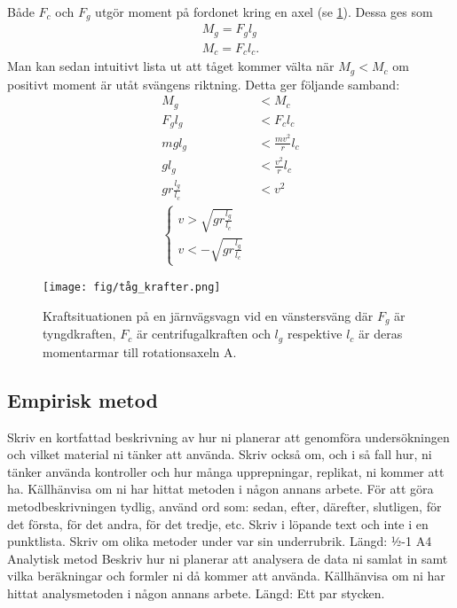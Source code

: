 Både $F_c$ och $F_g$ utgör moment på fordonet kring en axel (se \cref{fig:tåg_krafter_sväng}). Dessa ges som
\begin{gather}
    M_g = F_g l_g \\
    M_c = F_c l_c.
\end{gather}
Man kan sedan intuitivt lista ut att tåget kommer välta när $M_g < M_c$  om positivt moment är utåt svängens riktning. Detta ger följande samband:
\begin{align*}
    M_g &< M_c \\
    F_g l_g &< F_c l_c \\
    mg l_g &< \frac{mv^2}{r} l_c \\
    g l_g &< \frac{v^2}{r} l_c \\
    g r \frac{l_g}{l_c} &< v^2 \\
    \left\{
        \begin{array}{l}
            v > \sqrt{g r \frac{l_g}{l_c}} \\
            v < -\sqrt{g r \frac{l_g}{l_c}}
        \end{array}
    \right.
\end{align*}

\begin{figure}[h!]
    \centering
    \texttt{[image: fig/tåg\_krafter.png]}
    \caption{Kraftsituationen på en järnvägsvagn vid en vänstersväng där $F_g$ är tyngdkraften, $F_c$ är centrifugalkraften och $l_g$ respektive $l_c$ är deras momentarmar till rotationsaxeln A.}
    \label{fig:tåg_krafter_sväng}
\end{figure}

\subsection{Empirisk metod}
Skriv en kortfattad beskrivning av hur ni planerar att genomföra undersökningen och vilket material ni tänker att använda. Skriv också om, och i så fall hur, ni tänker använda kontroller och hur många upprepningar, replikat, ni kommer att ha. Källhänvisa om ni har hittat metoden i någon annans arbete. För att göra metodbeskrivningen tydlig, använd ord som: sedan, efter, därefter, slutligen, för det första, för det andra, för det tredje, etc. Skriv i löpande text och inte i en punktlista. Skriv om olika metoder under var sin underrubrik.
Längd: ½-1 A4
Analytisk metod
Beskriv hur ni planerar att analysera de data ni samlat in samt vilka beräkningar och formler ni då kommer att använda. Källhänvisa om ni har hittat analysmetoden i någon annans arbete.
Längd: Ett par stycken.

